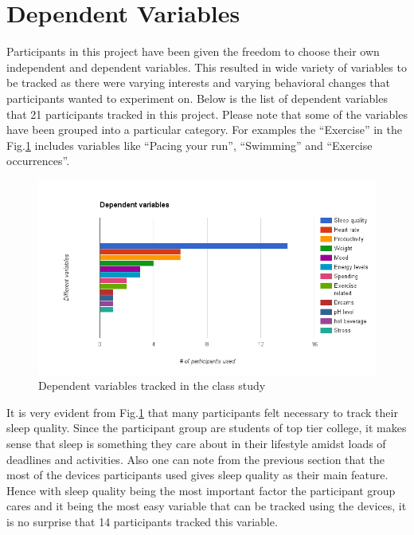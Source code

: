 \section{Dependent Variables}
Participants in this project have been given the freedom to choose their own independent and dependent variables. This resulted in wide variety of variables to be tracked as there were varying interests and varying behavioral changes that participants wanted to experiment on. Below is the list of dependent variables that 21 participants tracked in this project. Please note that some of the variables have been grouped into a particular category. For examples the “Exercise” in the Fig.\ref{fig:variables} includes variables like “Pacing your run”, “Swimming” and “Exercise occurrences”.

\begin{figure}[!t]\centering
\includegraphics[width=1.0\columnwidth]{images/dependent_variables.png}
\caption{\footnotesize Dependent variables tracked in the class study \label{fig:variables} 
}%
\end{figure}
%
It is very evident from Fig.\ref{fig:variables} that many participants felt necessary to track their sleep quality. Since the participant group are students of top tier college, it makes sense that sleep is something they care about in their lifestyle amidst loads of deadlines and activities. Also one can note from the previous section that the most of the devices participants used gives sleep quality as their main feature. Hence with sleep quality being the most important factor the participant group cares and it being the most easy variable that can be tracked using the devices, it is no surprise that 14 participants tracked this variable. 

